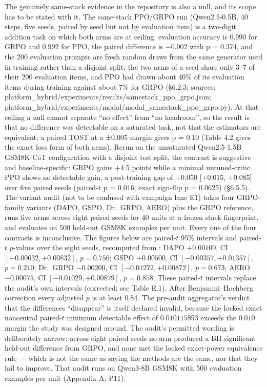 \documentclass[12pt,a4paper]{report}
\DeclareRobustCommand{\longtok}[1]{\texttt{\seqsplit{#1}}}
\begin{document}
The genuinely same-stack evidence in the repository is also a null, and
its scope has to be stated with it. The same-stack PPO/GRPO run
(Qwen2.5-0.5B, 40 steps, five seeds, paired by seed but not by
evaluation item) is a two-digit addition task on which both arms are at
ceiling: evaluation accuracy is 0.990 for GRPO and 0.992 for PPO, the
paired difference is −0.002 with p = 0.374, and the 200 evaluation
prompts are fresh random draws from the same generator used in training
rather than a disjoint split; the two arms of a seed share only 3--7 of
their 200 evaluation items, and PPO had drawn about 40\% of its
evaluation items during training against about 7\% for GRPO (§6.2.3;
sources: platform\_hybrid/experiments/results/samestack\_\allowbreak{}ppo\_\allowbreak{}grpo.json;
platform\_hybrid/experiments/modal/modal\_\allowbreak{}samestack\_\allowbreak{}ppo\_\allowbreak{}grpo.py). At
that ceiling a null cannot separate ``no effect'' from ``no headroom'',
so the result is that no difference was detectable on a saturated task,
not that the estimators are equivalent; a paired TOST at a ±0.005 margin
gives p = 0.10 (Table 4.2 gives the exact loss form of both arms). Rerun
on the unsaturated Qwen2.5-1.5B GSM8K-CoT configuration with a disjoint
test split, the contrast is suggestive and baseline-specific: GRPO gains
+4.5 points while a minimal untuned-critic PPO shows no detectable gain,
a post-training gap of +0.050 {[}+0.015, +0.085{]} over five paired
seeds (paired-t p = 0.016; exact sign-flip p = 0.0625) (§6.5.5). The
variant audit (not to be confused with campaign lane E1) takes four
GRPO-family variants (DAPO, GSPO, Dr.~GRPO, AERO) plus the GRPO
reference, runs five arms across eight paired seeds for 40 units at a
frozen stack fingerprint, and evaluates on 500 held-out GSM8K examples
per unit. Every one of the four contrasts is inconclusive. The figures
below are paired-\(t\) 95\% intervals and paired-\(t\) \(p\)-values over
the eight seeds, recomputed from
\longtok{zvf-program/audit/results/full/*.json}: DAPO \(+0.00100\), CI
\([-0.00632, +0.00832]\), \(p = 0.756\); GSPO \(+0.00500\), CI
\([-0.00357, +0.01357]\), \(p = 0.210\); Dr.~GRPO \(-0.00200\), CI
\([-0.01272, +0.00872]\), \(p = 0.673\); AERO \(-0.00075\), CI
\([-0.01029, +0.00879]\), \(p = 0.858\). These paired-\(t\) intervals
replace the audit's own intervals (corrected; see Table E.1). After
Benjamini--Hochberg correction every adjusted \(p\) is at least 0.84.
The pre-audit aggregator's verdict that the differences ``disappear'' is
itself declared invalid, because the locked exact noncentral
paired-\(t\) minimum detectable effect of \(0.010115893\) exceeds the
\(0.010\) margin the study was designed around. The audit's permitted
wording is deliberately narrow: across eight paired seeds no arm
produced a BH-significant held-out difference from GRPO, and none met
the locked exact-power equivalence rule --- which is not the same as
saying the methods are the same, nor that they fail to improve. That
audit runs on Qwen3-8B GSM8K with 500 evaluation examples per unit
(Appendix A, P11).
\end{document}
